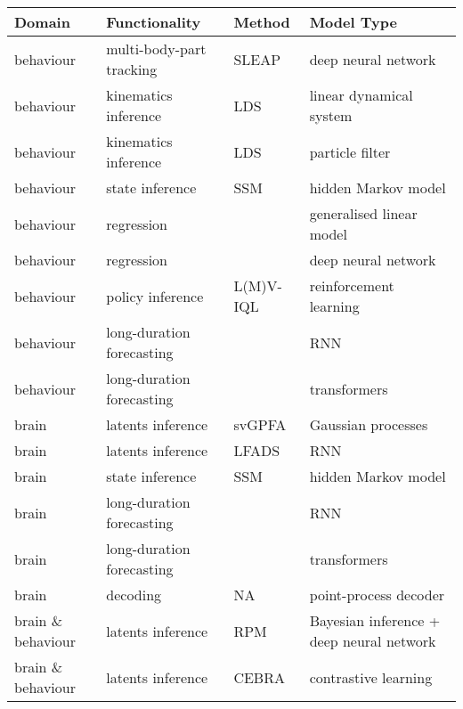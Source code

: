 \begin{table}
    \caption{Initial data analysis methods to disseminate}
    \label{table:initialMethodsToDisseminate}
    \begin{longtable}{|p{1.9cm}|p{3cm}|p{2.5cm}|p{4.5cm}|}
        \hline
        \textbf{Domain} & \textbf{Functionality} & \textbf{Method} & \textbf{Model Type} \\
        \hline\hline
        behaviour & multi-body-part tracking & SLEAP & deep neural network \\
        \hline
        behaviour & kinematics inference & LDS & linear dynamical system \\
        \hline
        behaviour & kinematics inference & LDS & particle filter \\
        \hline
        behaviour & state inference & SSM & hidden Markov model \\
        \hline
        behaviour & regression &  & generalised linear model \\
        \hline
        behaviour & regression &  & deep neural network \\
        \hline
        behaviour & policy inference & L(M)V-IQL & reinforcement learning \\
        \hline
        behaviour & long-duration forecasting &  & RNN \\
        \hline
        behaviour & long-duration forecasting &  & transformers \\
        \hline\hline
        brain & latents inference & svGPFA & Gaussian processes \\
        \hline
        brain & latents inference & LFADS & RNN \\
        \hline
        brain & state inference & SSM & hidden Markov model \\
        \hline
        brain & long-duration forecasting &  & RNN \\
        \hline
        brain & long-duration forecasting &  & transformers \\
        \hline
        brain & decoding & NA & point-process decoder \\
        \hline\hline
        brain \& behaviour & latents inference & RPM & Bayesian inference + deep neural network \\
        \hline
        brain \& behaviour & latents inference & CEBRA & contrastive learning \\
        \hline
    \end{longtable}
\end{table}

